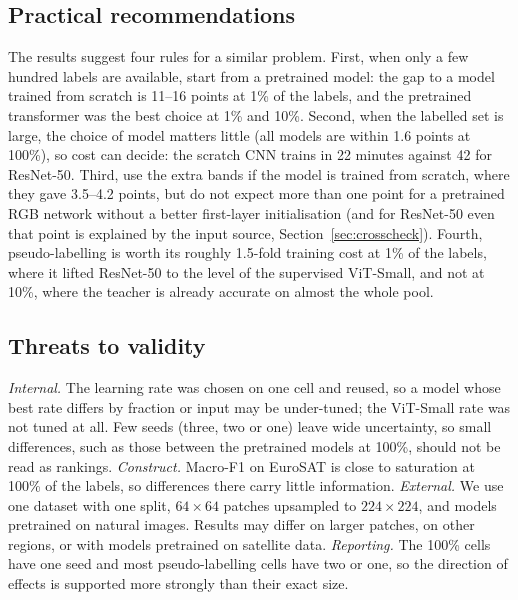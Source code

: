 \documentclass[conference]{IEEEtran}
\begin{document}
\subsection{Practical recommendations}
The results suggest four rules for a similar problem. First, when only a few hundred labels are available, start from a pretrained model: the gap to a model trained from scratch is 11--16 points at 1\% of the labels, and the pretrained transformer was the best choice at 1\% and 10\%. Second, when the labelled set is large, the choice of model matters little (all models are within 1.6 points at 100\%), so cost can decide: the scratch CNN trains in 22 minutes against 42 for ResNet-50. Third, use the extra bands if the model is trained from scratch, where they gave 3.5--4.2 points, but do not expect more than one point for a pretrained RGB network without a better first-layer initialisation (and for ResNet-50 even that point is explained by the input source, Section~\ref{sec:crosscheck}). Fourth, pseudo-labelling is worth its roughly 1.5-fold training cost at 1\% of the labels, where it lifted ResNet-50 to the level of the supervised ViT-Small, and not at 10\%, where the teacher is already accurate on almost the whole pool.

\subsection{Threats to validity}
\emph{Internal.} The learning rate was chosen on one cell and reused, so a model whose best rate differs by fraction or input may be under-tuned; the ViT-Small rate was not tuned at all. Few seeds (three, two or one) leave wide uncertainty, so small differences, such as those between the pretrained models at 100\%, should not be read as rankings. \emph{Construct.} Macro-F1 on EuroSAT is close to saturation at 100\% of the labels, so differences there carry little information. \emph{External.} We use one dataset with one split, $64\times64$ patches upsampled to $224\times224$, and models pretrained on natural images. Results may differ on larger patches, on other regions, or with models pretrained on satellite data. \emph{Reporting.} The 100\% cells have one seed and most pseudo-labelling cells have two or one, so the direction of effects is supported more strongly than their exact size.
\end{document}
